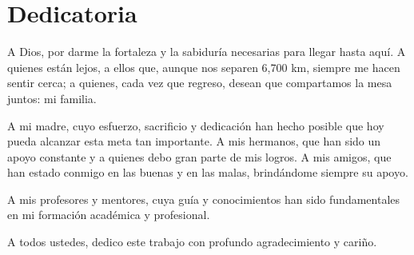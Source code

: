 \chapter*{Dedicatoria}
A Dios, por darme la fortaleza y la sabiduría necesarias para llegar hasta aquí.
A quienes están lejos, a ellos que, aunque nos separen 6,700 km, siempre me hacen sentir cerca; a quienes, cada vez que regreso, desean que compartamos la mesa juntos: mi familia.

A mi madre, cuyo esfuerzo, sacrificio y dedicación han hecho posible que hoy pueda alcanzar esta meta tan importante.
A mis hermanos, que han sido un apoyo constante y a quienes debo gran parte de mis logros.
A mis amigos, que han estado conmigo en las buenas y en las malas, brindándome siempre su apoyo.

A mis profesores y mentores, cuya guía y conocimientos han sido fundamentales en mi formación académica y profesional.

A todos ustedes, dedico este trabajo con profundo agradecimiento y cariño.
